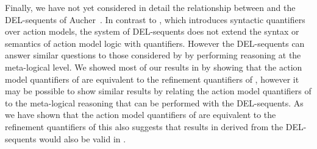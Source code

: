 Finally, we have not yet considered in detail the relationship between \logicAaml{} and the DEL-sequents of Aucher~\cite{aucher:2011,aucher:2012}.
In contrast to \logicAaml{}, which introduces syntactic quantifiers over action models, the system of DEL-sequents does not extend the syntax or semantics of action model logic with quantifiers.
However the DEL-sequents can answer similar questions to those considered by \logicAaml{} by performing reasoning at the meta-logical level.
We showed most of our results in \logicAaml{} by showing that the action model quantifiers of \logicAaml{} are equivalent to the refinement quantifiers of \logicRml{}, however it may be possible to show similar results by relating the action model quantifiers of \logicAaml{} to the meta-logical reasoning that can be performed with the DEL-sequents.
As we have shown that the action model quantifiers of \logicAaml{} are equivalent to the refinement quantifiers of \logicRml{} this also suggests that results in \logicAaml{} derived from the DEL-sequents would also be valid in \logicRml{}.
